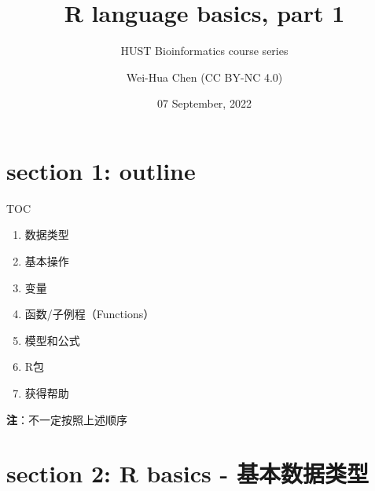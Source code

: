 \documentclass[ignorenonframetext,]{beamer}
\title{R language basics, part 1}
\subtitle{HUST Bioinformatics course series}
\author{Wei-Hua Chen (CC BY-NC 4.0)}
\date{07 September, 2022}
\providecommand{\tightlist}{%
  \setlength{\itemsep}{0pt}\setlength{\parskip}{0pt}}
\begin{document}
\frame{\titlepage}

\hypertarget{section-1-outline}{%
\section{section 1: outline}\label{section-1-outline}}

\begin{frame}{TOC}
\protect\hypertarget{toc}{}
\begin{enumerate}
\tightlist
\item
  数据类型
\item
  基本操作
\item
  变量
\item
  函数/子例程（Functions）
\item
  模型和公式
\item
  R包
\item
  获得帮助
\end{enumerate}

\textbf{注}：不一定按照上述顺序
\end{frame}

\hypertarget{section-2-r-basics---ux57faux672cux6570ux636eux7c7bux578b}{%
\section{section 2: R basics -
基本数据类型}\label{section-2-r-basics---ux57faux672cux6570ux636eux7c7bux578b}}
\end{document}
